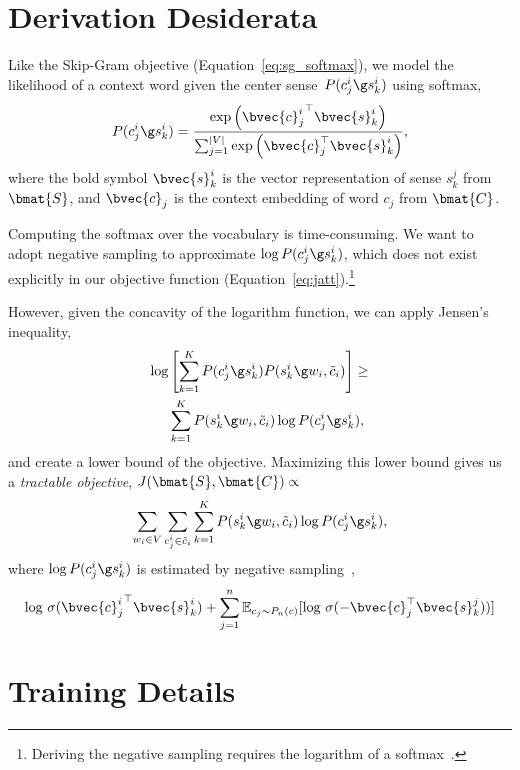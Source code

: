 



\section{Derivation Desiderata}
\label{sec:deriv-dess}

Like the Skip-Gram objective (Equation~\ref{eq:sg_softmax}), we model
the likelihood of a context word given the center
sense~$P(c_j^i \g s_k^i)$ using softmax,
\begin{equation}
P(c_j^i \g s_k^i) = \frac{\exp \left({\bvec{c}_j^i} ^\top \bvec{s}_k^i\right)}{\sum_{j=1}^{|V|}\exp \left(\bvec{c}_j ^\top \bvec{s}_k^i\right)},
\end{equation}
where the bold symbol $\bvec{s}_k^i$ is the vector representation of sense
$s_k^j$ from $\bmat{S}$, and $\bvec{c}_j$ is the context
embedding of word $c_j$ from $\bmat{C}$.

 
Computing the softmax over the vocabulary is time-consuming. We want
to adopt negative sampling to approximate $\log P(c_{j}^i \g s_k^i)$,
which does not exist explicitly in our objective function
(Equation~\ref{eq:jatt}).\footnote{Deriving the negative sampling
  requires the logarithm of a softmax~\citep{goldberg2014negative}. }

However, given the concavity of the logarithm function, we can apply
Jensen's inequality,
\begin{align}
  \log & \left[ \sum_{k=1}^{K} P(c_{j}^i \g s_k^i) P(s_k^i \g w_{i}, \tilde{c}_i) \right] \ge \\
  & \sum_{k=1}^{K} P(s_k^i \g w_{i}, \tilde{c}_i) \log  P(c_{j}^i  \g
s_k^i),  \notag
\label{eq:jensen}
\end{align}
and create a lower bound of the objective.  Maximizing this lower
bound gives us a \emph{tractable objective}, $J(\bmat{S}, \bmat{C}) \propto$
\begin{equation}
\sum_{w_i \in V}\sum_{c_{j}^i \in \tilde{c}_i} \sum_{k=1}^{K}
P(s_k^i \g w_{i}, \tilde{c}_i) \log P(c_{j}^i  \g s_k^i),
\label{eq:att}
\end{equation}
where $\log P(c_{j}^i \g s_k^i)$ is estimated by negative
sampling~\cite{mikolov2013b},
\begin{equation*}
\text{log }\sigma({\bvec{c}_j^i}^{\top} \bvec{s}_k^i)  + \sum_{j=1}^{n}\mathbb{E}_{c_j\sim P_n(c)}[\text{log }\sigma(-\bvec{c}_j^{\top}\bvec{s}_k^j))]
\label{eq:neg}
\end{equation*}


\section{Training Details}
\label{apdx:train}

